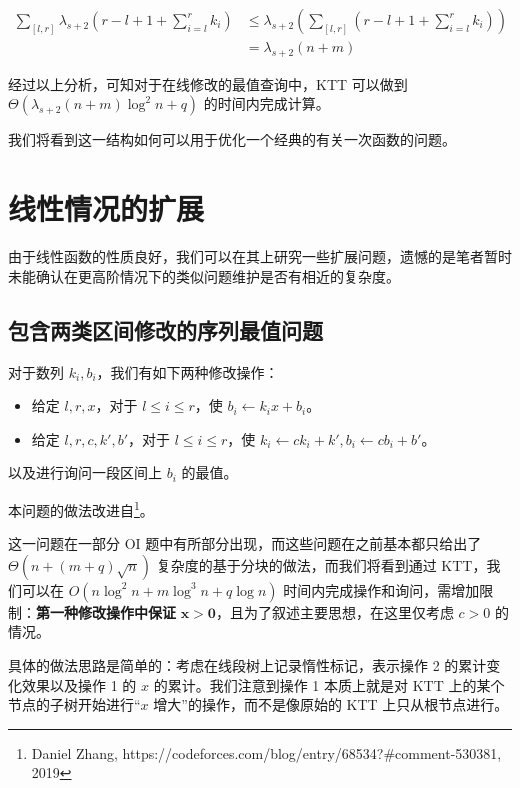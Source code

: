 \documentclass{noithesis}
\begin{document}
\begin{align*}
\sum_{[l, r]}\lambda_{s + 2}\left(r - l + 1 + \sum_{i=l}^r k_i\right) & \le \lambda_{s + 2}\left(\sum_{[l, r]} \left(r - l + 1 + \sum_{i=l}^r k_i\right)\right) \\
& = \lambda_{s + 2}(n + m)
\end{align*}

经过以上分析，可知对于在线修改的最值查询中，KTT 可以做到 $\Theta(\lambda_{s + 2}(n + m)\log^2 n + q)$ 的时间内完成计算。

我们将看到这一结构如何可以用于优化一个经典的有关一次函数的问题。

\section{线性情况的扩展}

由于线性函数的性质良好，我们可以在其上研究一些扩展问题，遗憾的是笔者暂时未能确认在更高阶情况下的类似问题维护是否有相近的复杂度。

\subsection{包含两类区间修改的序列最值问题}

对于数列 $k_i, b_i$，我们有如下两种修改操作：

\begin{itemize}
\item 给定 $l, r, x$，对于 $l\le i\le r$，使 $b_i \leftarrow k_ix + b_i$。
\item 给定 $l, r, c, k', b'$，对于 $l\le i\le r$，使 $k_i \leftarrow ck_i + k', b_i \leftarrow cb_i + b'$。
\end{itemize}

以及进行询问一段区间上 $b_i$ 的最值。

本问题的做法改进自\footnote{Daniel Zhang, https://codeforces.com/blog/entry/68534?\#comment-530381, 2019}。

这一问题在一部分 OI 题中有所部分出现，而这些问题在之前基本都只给出了 $\Theta(n + (m + q)\sqrt n)$ 复杂度的基于分块的做法，而我们将看到通过 KTT，我们可以在 $O(n\log^2 n + m\log^3 n + q\log n)$ 时间内完成操作和询问，需增加限制：\textbf{第一种修改操作中保证} $\mathbf{x > 0}$，且为了叙述主要思想，在这里仅考虑 $c > 0$ 的情况。

具体的做法思路是简单的：考虑在线段树上记录惰性标记，表示操作 2 的累计变化效果以及操作 1 的 $x$ 的累计。我们注意到操作 1 本质上就是对 KTT 上的某个节点的子树开始进行“$x$ 增大”的操作，而不是像原始的 KTT 上只从根节点进行。
\end{document}
